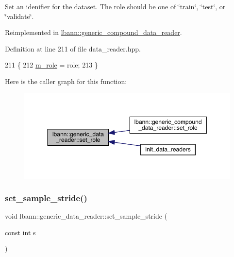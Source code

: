 Set an idenifier for the dataset. The role should be one of \char`\"{}train\char`\"{}, \char`\"{}test\char`\"{}, or \char`\"{}validate\char`\"{}. 

Reimplemented in \hyperlink{classlbann_1_1generic__compound__data__reader_a19302078a484337e86b1549b48ef13ad}{lbann\+::generic\+\_\+compound\+\_\+data\+\_\+reader}.



Definition at line 211 of file data\+\_\+reader.\+hpp.


\begin{DoxyCode}
211                                         \{
212     \hyperlink{classlbann_1_1generic__data__reader_a2f311e8c91be2a7ac93f6f141bb714a1}{m\_role} = role;
213   \}
\end{DoxyCode}
Here is the caller graph for this function\+:\nopagebreak
\begin{figure}[H]
\begin{center}
\leavevmode
\includegraphics[width=350pt]{classlbann_1_1generic__data__reader_adeb9413be971a0c1454fdeb46fea0716_icgraph}
\end{center}
\end{figure}
\mbox{\label{classlbann_1_1generic__data__reader_adb90391e3e9c8e3c2aba4d4a0911ca82}} 
\subsubsection{\texorpdfstring{set\+\_\+sample\+\_\+stride()}{set\_sample\_stride()}}
{\footnotesize\ttfamily void lbann\+::generic\+\_\+data\+\_\+reader\+::set\+\_\+sample\+\_\+stride (\begin{DoxyParamCaption}\item[{const int}]{s }\end{DoxyParamCaption})\hspace{0.3cm}{\ttfamily [inline]}}



